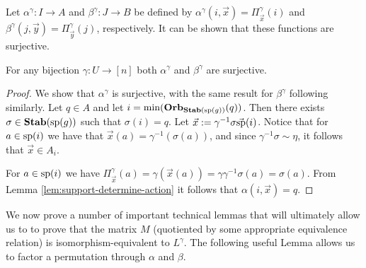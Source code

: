 \documentclass[../paper.tex]{subfiles}
\begin{document}
Let $\alpha^{\gamma}: I \rightarrow A$ and $\beta^{\gamma}: J \rightarrow B$ be
defined by $\alpha^{\gamma} (i, \vec{x}) = \Pi^{\gamma}_{\vec{x}}(i)$ and
$\beta^{\gamma} (j, \vec{y}) = \Pi^{\gamma}_{\vec{y}}(j)$, respectively. It can
be shown that these functions are surjective.

\begin{lem} 
  For any bijection $\gamma : U \rightarrow [n]$ both $\alpha^{\gamma}$ and
  $\beta^{\gamma}$ are surjective.
  \label{lem:alpha-beta-surjective}
\end{lem}
\begin{proof}
  We show that $\alpha^{\gamma}$ is surjective, with the same result for
  $\beta^{\gamma}$ following similarly. Let $q \in A$ and let $i = \min
  (\text{\textbf{Orb}}_{\text{\textbf{Stab}} (\text{sp} (g))} (q))$. Then there exists $\sigma \in \text{\textbf{Stab}} (\text{sp} (g))$ such that
  $\sigma (i) = q$. Let $\vec{x} := \gamma^{-1} \sigma \vec{\text{sp}}(i)$. Notice
  that for $a \in \text{sp}(i)$ we have that $\vec{x}(a) = \gamma^{-1} (\sigma
  (a))$, and since $\gamma^{-1} \sigma \sim \eta$, it follows that $\vec{x} \in
  A_i$.

  For $a \in \text{sp}(i)$ we have $\Pi^{\gamma}_{\vec{x}} (a) = \gamma
  (\vec{x}(a)) = \gamma \gamma^{-1} \sigma (a) = \sigma (a)$. From Lemma
  \ref{lem:support-determine-action} it follows that $\alpha(i, \vec{x}) = q$.
\end{proof}




We now prove a number of important technical lemmas that will ultimately allow
us to to prove that the matrix $M$ (quotiented by some appropriate equivalence
relation) is isomorphism-equivalent to $L^{\gamma}$. The following useful Lemma
allows us to factor a permutation through $\alpha$ and $\beta$.
\end{document}
